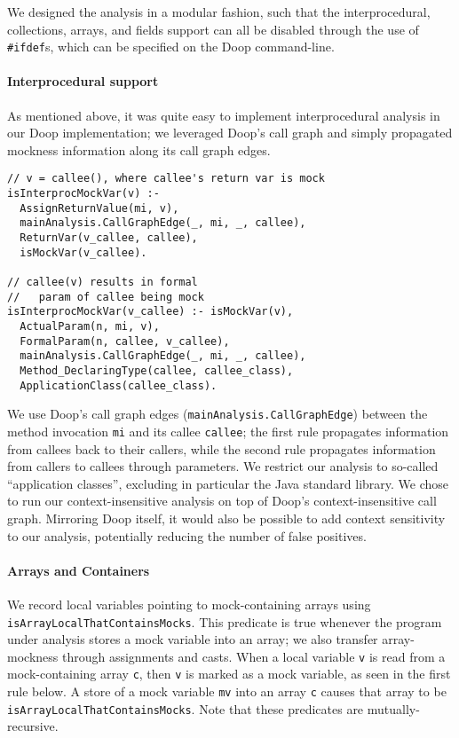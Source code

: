 We designed the analysis in a modular fashion, such that the interprocedural, collections, arrays, and fields support can all be disabled through the use of \verb+#ifdef+s, which can be specified on the Doop command-line.

\paragraph{Interprocedural support}
As mentioned above, it was quite easy to implement interprocedural analysis in our Doop implementation; we leveraged Doop's call graph and simply propagated mockness information along its call graph edges.

\begin{lstlisting}[basicstyle=\ttfamily\small,numbers=none,caption={Two rules give interprocedural analysis in Doop.}]
// v = callee(), where callee's return var is mock
isInterprocMockVar(v) :-
  AssignReturnValue(mi, v),
  mainAnalysis.CallGraphEdge(_, mi, _, callee),
  ReturnVar(v_callee, callee),
  isMockVar(v_callee).

// callee(v) results in formal
//   param of callee being mock
isInterprocMockVar(v_callee) :- isMockVar(v),
  ActualParam(n, mi, v),
  FormalParam(n, callee, v_callee),
  mainAnalysis.CallGraphEdge(_, mi, _, callee),
  Method_DeclaringType(callee, callee_class),
  ApplicationClass(callee_class).
\end{lstlisting}
We use Doop's call graph edges (\texttt{mainAnalysis.CallGraphEdge}) between the method invocation {\tt mi} and its callee {\tt callee}; the first rule propagates information from callees back to their callers, while the second rule propagates information from callers to callees through parameters. We restrict our analysis to so-called ``application classes'', excluding in particular the Java standard library. We chose to run our context-insensitive analysis on top of Doop's context-insensitive call graph. Mirroring Doop itself, it would also be possible to add context sensitivity to our analysis, potentially reducing the number of false positives.%

\paragraph{Arrays and Containers} We record local variables pointing to mock-containing arrays using  {\tt isArrayLocalThatContainsMocks}. This predicate is true whenever the program under analysis stores a mock variable into an array; we also transfer array-mockness through assignments and casts. When a local variable \texttt{v} is read from a mock-containing array \texttt{c}, then \texttt{v} is marked as a mock variable, as seen in the first rule below. A store of a mock variable \texttt{mv} into an array \texttt{c} causes that array to be \texttt{isArrayLocalThatContainsMocks}. Note that these predicates are mutually-recursive. 

